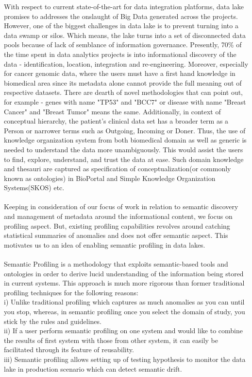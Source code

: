 With respect to current state-of-the-art for data integration platforms, data lake promises to addresses the onslaught of Big Data generated across the projects\cite{fang2015managing}. However, one of the biggest challenges in data lake is to prevent turning into a data swamp or silos. Which means, the lake turns into a set of disconnected data pools because of lack of semblance of information governance. Presently, 70\%  of the time spent in data analytics projects is into informational discovery of the data - identification, location, integration and re-engineering\cite{terrizzano2015data}. Moreover, especially for cancer genomic data, where the users must have a first hand knowledge in biomedical area since its metadata alone cannot provide the full meaning out of respective datasets. There are dearth of novel methodologies that can point out, for example - genes with name "TP53" and "BCC7" or disease with name "Breast Cancer" and "Breast Tumor" means the same. Additionally, in context of conceptual hierarchy, the patient's clinical data set has a broader term as a Person or narrower terms such as Outgoing, Incoming or Doner.  Thus, the use of knowledge organization system from both biomedical domain as well as generic is needed to understand the data more unambiguously.  This would assist the users to find, explore, understand, and trust the data at ease. Such domain knowledge and thesauri are captured as specification of conceptualization(or commonly known as ontologies) in BioPortal\cite{noy2009bioportal} and Simple Knowledge Organization Systems(SKOS)\cite{miles2005skos} etc. \\~\\
Keeping in consideration of our focus of work in relation to semantic discovery and management of metadata around the informational content, we focus on profiling aspect. But, existing profiling capabilities revolves around catching statistical summaries of anomalies and does not offer semantic aspect. This motivates us to an idea of enabling semantic profiling in data lakes. \\~\\
Semantic Profiling is a methodology that exploits semantic-based tools and ontologies in order to derive lucid understanding of the information being stored in current systems. This approach is much more rigorous than former traditional profiling techniques for the following reasons: \\
i) Unlike traditional profiling which captures as much anomalies as you can until you stop, whereas, in semantic profiling once you select the domain of study, you stick by the rules and guidelines. \\
ii) If a user perform semantic profiling on one system and would like to combine the results of first system  with those from other system, it can easily be facilitated through its feature of reusability. \\
iii) Semantic profiling allows setting up of testing hypothesis to monitor the data lake in production scenario which can detect semantic drift.\\~\\

